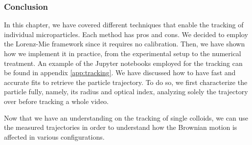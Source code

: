 \subsubsection{Conclusion}

In this chapter, we have covered different techniques that enable the tracking of individual microparticles. Each method has pros and cons. We decided to employ the Lorenz-Mie framework since it requires no calibration. Then, we have shown how we implement it in practice, from the experimental setup to the numerical treatment. An example of the Jupyter notebooks employed for the tracking can be found in appendix \ref{app:tracking}.  We have discussed how to have fast and accurate fits to retrieve the particle trajectory. To do so, we first characterize the particle fully, namely, its radius and optical index, analyzing solely the trajectory over before tracking a whole video. 

Now that we have an understanding on the tracking of single colloids, we can use the measured trajectories in order to understand how the Brownian motion is affected in various configurations. 

